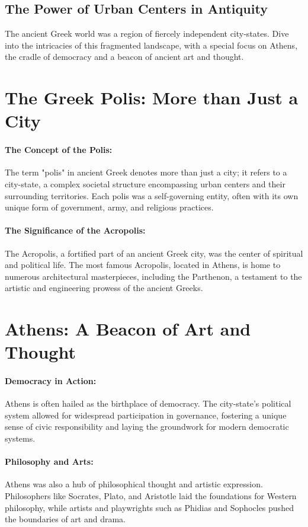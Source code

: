 \documentclass{book}
\begin{document}
\subsection*{The Power of Urban Centers in Antiquity}
The ancient Greek world was a region of fiercely independent city-states. Dive into the intricacies of this fragmented landscape, with a special focus on Athens, the cradle of democracy and a beacon of ancient art and thought.

\section*{The Greek Polis: More than Just a City}

\paragraph{The Concept of the Polis:}
The term "polis" in ancient Greek denotes more than just a city; it refers to a city-state, a complex societal structure encompassing urban centers and their surrounding territories. Each polis was a self-governing entity, often with its own unique form of government, army, and religious practices.

\paragraph{The Significance of the Acropolis:}
The Acropolis, a fortified part of an ancient Greek city, was the center of spiritual and political life. The most famous Acropolis, located in Athens, is home to numerous architectural masterpieces, including the Parthenon, a testament to the artistic and engineering prowess of the ancient Greeks.

\section*{Athens: A Beacon of Art and Thought}

\paragraph{Democracy in Action:}
Athens is often hailed as the birthplace of democracy. The city-state’s political system allowed for widespread participation in governance, fostering a unique sense of civic responsibility and laying the groundwork for modern democratic systems.

\paragraph{Philosophy and Arts:}
Athens was also a hub of philosophical thought and artistic expression. Philosophers like Socrates, Plato, and Aristotle laid the foundations for Western philosophy, while artists and playwrights such as Phidias and Sophocles pushed the boundaries of art and drama.
\end{document}
